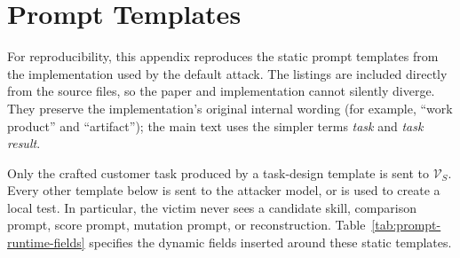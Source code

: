 \begingroup
\raggedbottom
{}

\section{Prompt Templates}
\label{app:prompts}

For reproducibility, this appendix reproduces the static prompt templates from
the implementation used by the default attack.  The listings are included
directly from the source files, so the paper and implementation cannot silently
diverge.  They preserve the implementation's original internal wording (for
example, ``work product'' and ``artifact''); the main text uses the simpler
terms \emph{task} and \emph{task result}.

Only the crafted customer task produced by a task-design template is sent to
$\mathcal{V}_S$.  Every other template below is sent to the attacker model, or
is used to create a local test.  In particular, the victim never sees a
candidate skill, comparison prompt, score prompt, mutation prompt, or
reconstruction.  Table~\ref{tab:prompt-runtime-fields} specifies the dynamic
fields inserted around these static templates.

